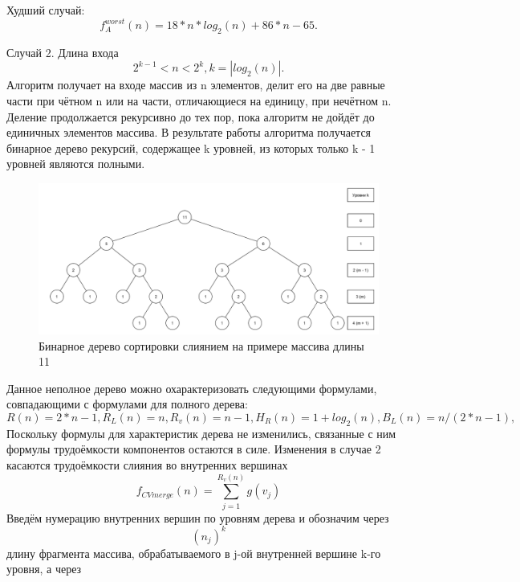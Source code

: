 \documentclass[12pt,a4paper]{scrartcl}
\begin{document}
Худший случай:
\begin{equation}\label{eq2.22}
f_A^{worst}(n) =  18*n*log_2(n) + 86*n - 65.
\end{equation}

Случай 2. Длина входа 
\begin{equation*}
2^{k-1} < n < 2^k, k = |log_2(n)|.
\end{equation*}
Алгоритм получает на входе массив из n элементов, делит его на две равные части при чётном n или на части, отличающиеся на единицу, при нечётном n. Деление продолжается рекурсивно до тех пор, пока алгоритм не дойдёт до единичных элементов массива. В результате работы алгоритма получается бинарное дерево рекурсий, содержащее k уровней, из которых только k - 1 уровней являются полными.
\begin{figure}[h!]
	\centering
	\includegraphics[width=\linewidth]{2.png}
	\caption{Бинарное дерево сортировки слиянием на примере массива длины 11}
	\label{graph2.12}
\end{figure}
Данное неполное дерево можно охарактеризовать следующими формулами, совпадающими с формулами для полного дерева:
\begin{equation}\label{eq2.23}
R(n) = 2*n - 1, R_L(n) = n, R_v(n) = n - 1, H_R(n) = 1 + log_2(n), B_L(n) = n / (2*n - 1),
\end{equation}
Поскольку формулы для характеристик дерева не изменились, связанные с ним формулы трудоёмкости компонентов остаются в силе. Изменения в случае 2 касаются трудоёмкости слияния во внутренних вершинах
\begin{equation}\label{eq2.24}
f_{CV merge}(n) = \sum \limits_{j=1}^{R_v(n)} g(v_j)
\end{equation}
Введём нумерацию внутренних вершин по уровням дерева и обозначим через
\begin{equation*}
(n_j)^k
\end{equation*}
длину фрагмента массива, обрабатываемого в j-ой внутренней вершине k-го уровня, а через
\end{document}
